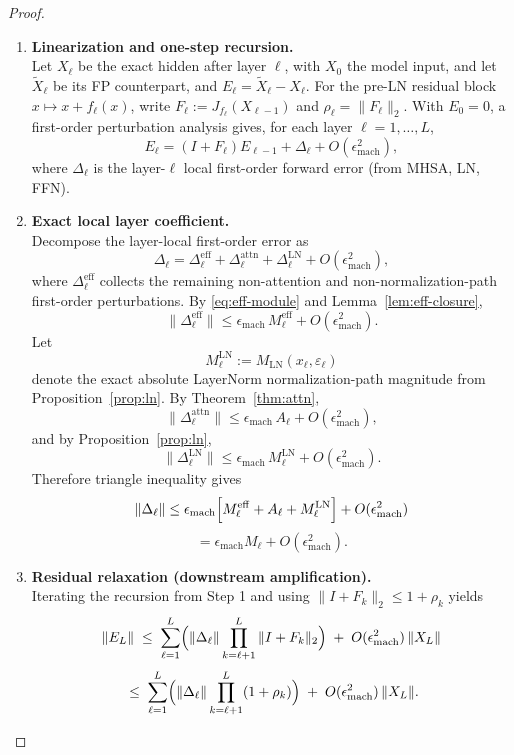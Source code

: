 \documentclass[twoside]{article}
\theoremstyle{definition}
\theoremstyle{remark}
\begin{document}
\begin{proof}
\phantom{.}
\begin{enumerate}
  \item \textbf{Linearization and one-step recursion.}\\
  Let $X_\ell$ be the exact hidden after layer $\ell$, with $X_0$ the model input, and let $\widetilde{X}_\ell$ be its FP counterpart,
  and $E_\ell=\widetilde{X}_\ell-X_\ell$. For the pre-LN residual block $x\mapsto x+f_\ell(x)$,
  write $F_\ell:=J_{f_\ell}(X_{\ell-1})$ and $\rho_\ell=\|F_\ell\|_2$. With $E_0=0$, a first-order
  perturbation analysis gives, for each layer $\ell=1,\dots,L$,
  \[
  E_\ell=(I+F_\ell)E_{\ell-1}+\Delta_\ell+O(\epsilon_{\mathrm{mach}}^2),
  \]
  where $\Delta_\ell$ is the layer-$\ell$ local first-order forward error (from MHSA, LN, FFN).

  \item \textbf{Exact local layer coefficient.}\\
  Decompose the layer-local first-order error as
  \[
  \Delta_\ell
  =
  \Delta^{\mathrm{eff}}_\ell + \Delta^{\mathrm{attn}}_\ell + \Delta^{\mathrm{LN}}_\ell
  + O(\epsilon_{\mathrm{mach}}^2),
  \]
  where $\Delta^{\mathrm{eff}}_\ell$ collects the remaining non-attention and
  non-normalization-path
  first-order perturbations. By \eqref{eq:eff-module} and
  Lemma~\ref{lem:eff-closure},
  \[
  \|\Delta^{\mathrm{eff}}_\ell\|
  \le \epsilon_{\mathrm{mach}}\,M^{\mathrm{eff}}_\ell + O(\epsilon_{\mathrm{mach}}^2).
  \]
  Let
  \[
  M^{\mathrm{LN}}_\ell := M_{\mathrm{LN}}(x_\ell,\varepsilon_\ell)
  \]
  denote the exact absolute LayerNorm normalization-path magnitude from
  Proposition~\ref{prop:ln}. By Theorem~\ref{thm:attn},
  \[
  \|\Delta^{\mathrm{attn}}_\ell\|
  \le \epsilon_{\mathrm{mach}}\,A_\ell + O(\epsilon_{\mathrm{mach}}^2),
  \]
  and by Proposition~\ref{prop:ln},
  \[
  \|\Delta^{\mathrm{LN}}_\ell\|
  \le \epsilon_{\mathrm{mach}}\,M^{\mathrm{LN}}_\ell
  + O(\epsilon_{\mathrm{mach}}^2).
  \]
  Therefore triangle inequality gives
  \[
  \|\Delta_\ell\|
  \le
  \epsilon_{\mathrm{mach}}
  \Bigl[
  M^{\mathrm{eff}}_\ell
  + A_\ell
  + M^{\mathrm{LN}}_\ell
  \Bigr]
  + O(\epsilon_{\mathrm{mach}}^2)
  \]
  \[
  = \epsilon_{\mathrm{mach}} M_\ell + O(\epsilon_{\mathrm{mach}}^2).
  \]

  \item \textbf{Residual relaxation (downstream amplification).}\\
  Iterating the recursion from Step 1 and using $\|I+F_k\|_2\le 1+\rho_k$ yields
  \[
  \|E_L\|
  \;\le\;
  \sum_{\ell=1}^{L}
  \Bigl(\|\Delta_\ell\|\prod_{k=\ell+1}^{L}\|I+F_k\|_2\Bigr)
  \;+\; O(\epsilon_{\mathrm{mach}}^2)\,\|X_L\|
  \]
  \[
  \;\le\;
  \sum_{\ell=1}^{L}
  \Bigl(\|\Delta_\ell\|\prod_{k=\ell+1}^{L}(1+\rho_k)\Bigr)
  \;+\; O(\epsilon_{\mathrm{mach}}^2)\,\|X_L\|.
  \]


\end{enumerate}
\end{proof}
\end{document}
